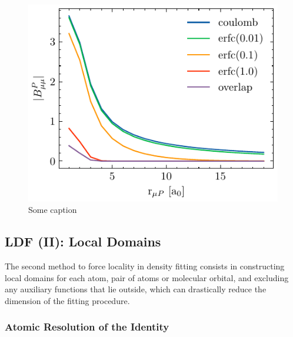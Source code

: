 \begin{figure}
\centering
\includegraphics[scale=1.0]{ldf.pdf}
\caption{Some caption}
\end{figure}



\subsection{LDF (II): Local Domains}

The second method to force locality in density fitting consists in constructing local domains for each atom, pair of atoms or molecular orbital, and excluding any auxiliary functions that lie outside, which can drastically reduce the dimension of the fitting procedure. 

\subsubsection{Atomic Resolution of the Identity}

